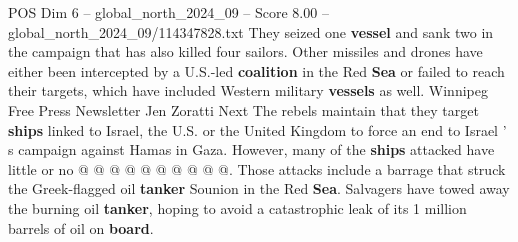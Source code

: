 \begin{textsample}{POS Dim 6 – global\_north\_2024\_09 – Score 8.00 – global\_north\_2024\_09/114347828.txt}
They seized one \textbf{vessel} and sank two in the campaign that has also killed four sailors.
Other missiles and drones have either been intercepted by a U.S.-led \textbf{coalition} in the Red \textbf{Sea} or failed to reach their targets, which have included Western military \textbf{vessels} as well.
Winnipeg Free Press Newsletter Jen Zoratti Next The rebels maintain that they target \textbf{ships} linked to Israel, the U.S. or the United Kingdom to force an end to Israel ' s campaign against Hamas in Gaza.
However, many of the \textbf{ships} attacked have little or no @ @ @ @ @ @ @ @ @ @.
Those attacks include a barrage that struck the Greek-flagged oil \textbf{tanker} Sounion in the Red \textbf{Sea}.
Salvagers have towed away the burning oil \textbf{tanker}, hoping to avoid a catastrophic leak of its 1 million barrels of oil on \textbf{board}.

\end{textsample}
